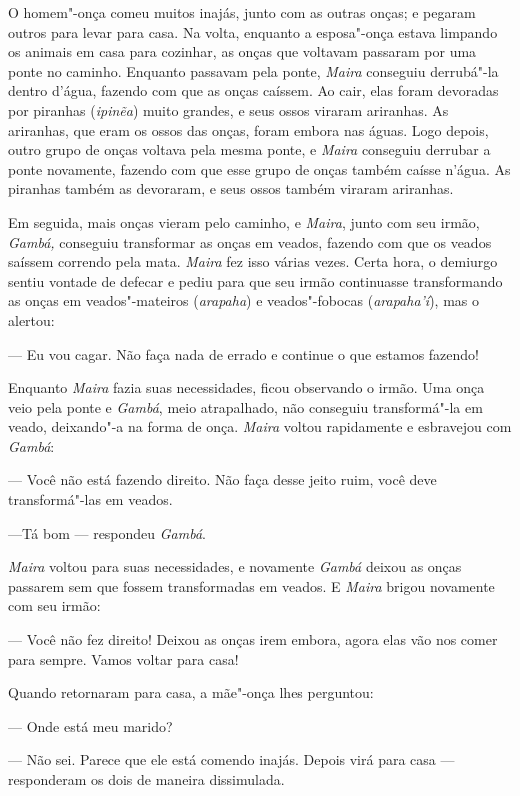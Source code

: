 O homem"-onça comeu muitos inajás, junto com as outras onças; e pegaram
outros para levar para casa. Na volta, enquanto a esposa"-onça estava
limpando os animais em casa para cozinhar, as onças que voltavam
passaram por uma ponte no caminho. Enquanto passavam pela ponte,
\emph{Maira} conseguiu derrubá"-la dentro d'água, fazendo com que as
onças caíssem. Ao cair, elas foram devoradas por piranhas
(\emph{ipinẽa}) muito grandes, e seus ossos viraram ariranhas. As
ariranhas, que eram os ossos das onças, foram embora nas águas. Logo
depois, outro grupo de onças voltava pela mesma ponte, e \emph{Maira}
conseguiu derrubar a ponte novamente, fazendo com que esse grupo de
onças também caísse n'água. As piranhas também as devoraram, e seus
ossos também viraram ariranhas.

Em seguida, mais onças vieram pelo caminho, e \emph{Maira}, junto com
seu irmão, \emph{Gambá,} conseguiu transformar as onças em veados,
fazendo com que os veados saíssem correndo pela mata. \emph{Maira} fez
isso várias vezes. Certa hora, o demiurgo sentiu vontade de defecar e
pediu para que seu irmão continuasse transformando as onças em
veados"-mateiros (\emph{arapaha}) e veados"-fobocas (\emph{arapaha'í}),
mas o alertou:

--- Eu vou cagar. Não faça nada de errado e continue o que estamos
fazendo!

Enquanto \emph{Maira} fazia suas necessidades, ficou observando o irmão.
Uma onça veio pela ponte e \emph{Gambá}, meio atrapalhado, não conseguiu
transformá"-la em veado, deixando"-a na forma de onça. \emph{Maira} voltou
rapidamente e esbravejou com \emph{Gambá}:

--- Você não está fazendo direito. Não faça desse jeito ruim, você deve
transformá"-las em veados.

---Tá bom --- respondeu \emph{Gambá}.

\emph{Maira} voltou para suas necessidades, e novamente \emph{Gambá}
deixou as onças passarem sem que fossem transformadas em veados. E
\emph{Maira} brigou novamente com seu irmão:

--- Você não fez direito! Deixou as onças irem embora, agora elas
vão nos comer para sempre. Vamos voltar para casa!

Quando retornaram para casa, a mãe"-onça lhes perguntou:

--- Onde está meu marido?

--- Não sei. Parece que ele está comendo inajás. Depois virá para casa ---
responderam os dois de maneira dissimulada.

